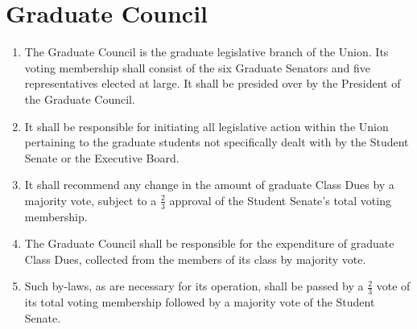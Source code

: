 \section{Graduate Council}
\begin{enumerate}
\item The Graduate Council is the graduate legislative branch of the Union. Its voting membership shall consist of the six Graduate Senators and five representatives elected at large. It shall be presided over by the President of the Graduate Council.
\item It shall be responsible for initiating all legislative action within the Union pertaining to the graduate students not specifically dealt with by the Student Senate or the Executive Board.
\item It shall recommend any change in the amount of graduate Class Dues by a majority vote, subject
to a $\frac{2}{3}$ approval of the Student Senate’s total voting membership.
\item The Graduate Council shall be responsible for the expenditure of graduate Class Dues, collected from the members of its class by majority vote.
\item Such by-laws, as are necessary for its operation, shall be passed by a $\frac{2}{3}$ vote of its total voting membership followed by a majority vote of the Student Senate.
\end{enumerate}


